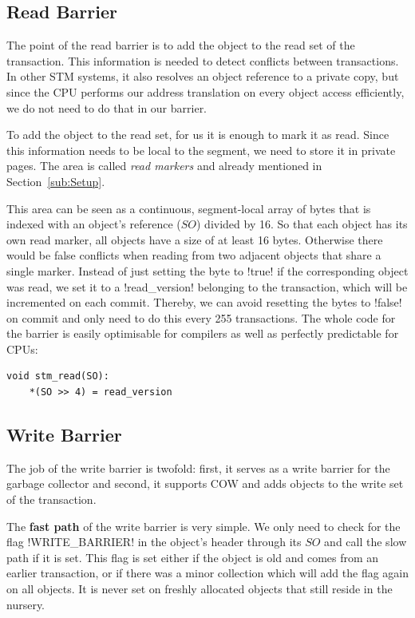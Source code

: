 \documentclass{sigplanconf}
\makeatletter
\renewcommand\lstinline[1][]{%
  \Collectverb{\@@myverb}%
}
\def\@@myverb#1{%
    \begingroup
    \fboxsep=0.2em
    \colorbox{verylightgray}{\oldlstinline|#1|}%
    \endgroup
}
\makeatother
\begin{document}
\subsection{Read Barrier}

The point of the read barrier is to add the object to the read set of
the transaction. This information is needed to detect conflicts
between transactions. In other STM systems, it also resolves an object reference to
a private copy, but since the CPU performs our address translation on
every object access efficiently, we do not need to do that in our
barrier.

To add the object to the read set, for us it is enough to mark it as
read. Since this information needs to be local to the segment, we need
to store it in private pages. The area is called \emph{read markers}
and already mentioned in Section~\ref{sub:Setup}.

This area can be seen as a continuous, segment-local array of bytes
that is indexed with an object's reference ($SO$) divided by 16. So
that each object has its own read marker, all objects have a size of
at least 16 bytes. Otherwise there would be false conflicts when
reading from two adjacent objects that share a single marker.
Instead of just setting the byte to \lstinline!true!  if the
corresponding object was read, we set it to a \lstinline!read_version!
belonging to the transaction, which will be incremented on each
commit.  Thereby, we can avoid resetting the bytes to
\lstinline!false!  on commit and only need to do this every 255
transactions. The whole code for the barrier is easily optimisable for
compilers as well as perfectly predictable for CPUs:

\begin{lstlisting}
void stm_read(SO):
    *(SO >> 4) = read_version
\end{lstlisting}


\subsection{Write Barrier}

The job of the write barrier is twofold: first, it serves as a write
barrier for the garbage collector and second, it supports COW and adds
objects to the write set of the transaction.

The \textbf{fast path} of the write barrier is very simple. We only
need to check for the flag \lstinline!WRITE_BARRIER!  in the object's
header through its $SO$ and call the slow path if it is set. This flag
is set either if the object is old and comes from an earlier
transaction, or if there was a minor collection which will add the
flag again on all objects. It is never set on freshly allocated
objects that still reside in the nursery.
\end{document}
